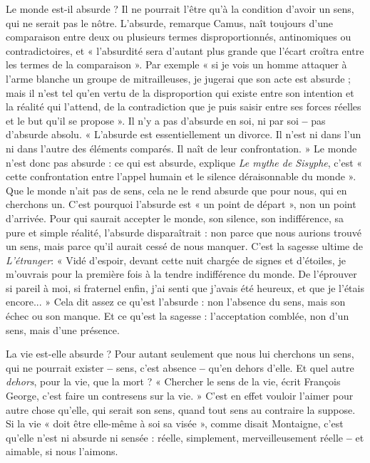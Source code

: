 Le monde est-il absurde ? Il ne pourrait l’être qu’à la condition d’avoir
un sens, qui ne serait pas le nôtre. L’absurde, remarque Camus, naît toujours
d’une comparaison entre deux ou plusieurs termes disproportionnés,
antinomiques ou contradictoires, et « l’absurdité sera d’autant plus grande
que l'écart croîtra entre les termes de la comparaison ». Par exemple « si je
vois un homme attaquer à l’arme blanche un groupe de mitrailleuses, je
jugerai que son acte est absurde ; mais il n’est tel qu’en vertu de la disproportion
qui existe entre son intention et la réalité qui l'attend, de la contradiction
que je puis saisir entre ses forces réelles et le but qu’il se propose ».
Il n’y a pas d’absurde en soi, ni par soi {\bf --} pas d’absurde absolu. « L’absurde
est essentiellement un divorce. Il n’est ni dans l’un ni dans l’autre des éléments
comparés. Il naît de leur confrontation. » Le monde n’est donc pas
absurde : ce qui est absurde, explique {\it Le mythe de Sisyphe}, c'est « cette
confrontation entre l’appel humain et le silence déraisonnable du monde ».
Que le monde n’ait pas de sens, cela ne le rend absurde que pour nous, qui
en cherchons un. C’est pourquoi l’absurde est « un point de départ », non
un point d'arrivée. Pour qui saurait accepter le monde, son silence, son
indifférence, sa pure et simple réalité, l'absurde disparaîtrait : non parce que
nous aurions trouvé un sens, mais parce qu'il aurait cessé de nous manquer.
C’est la sagesse ultime de {\it L'étranger}: « Vidé d’espoir, devant cette nuit
chargée de signes et d’étoiles, je m’ouvrais pour la première fois à la tendre
indifférence du monde. De l’éprouver si pareil à moi, si fraternel enfin, j'ai
senti que j'avais été heureux, et que je l’étais encore... » Cela dit assez ce
qu’est l'absurde : non l'absence du sens, mais son échec ou son manque. Et
ce qu'est la sagesse : l’acceptation comblée, non d’un sens, mais d’une présence.

La vie est-elle absurde ? Pour autant seulement que nous lui cherchons un
sens, qui ne pourrait exister {\bf --} sens, c’est absence {\bf --} qu’en dehors d'elle. Et quel
autre {\it dehors}, pour la vie, que la mort ? « Chercher le sens de la vie, écrit François
George, c’est faire un contresens sur la vie. » C’est en effet vouloir l'aimer
pour autre chose qu’elle, qui serait son sens, quand tout sens au contraire la
suppose. Si la vie « doit être elle-même à soi sa visée », comme disait Montaigne,
c'est qu’elle n’est ni absurde ni sensée : réelle, simplement, merveilleusement
réelle {\bf --} et aimable, si nous l’aimons.


